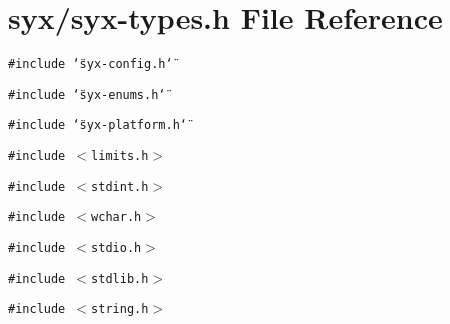 \hypertarget{syx-types_8h}{
\section{syx/syx-types.h File Reference}
\label{syx-types_8h}
}
{\tt \#include \char`\"{}syx-config.h\char`\"{}}\par
{\tt \#include \char`\"{}syx-enums.h\char`\"{}}\par
{\tt \#include \char`\"{}syx-platform.h\char`\"{}}\par
{\tt \#include $<$limits.h$>$}\par
{\tt \#include $<$stdint.h$>$}\par
{\tt \#include $<$wchar.h$>$}\par
{\tt \#include $<$stdio.h$>$}\par
{\tt \#include $<$stdlib.h$>$}\par
{\tt \#include $<$string.h$>$}\par
